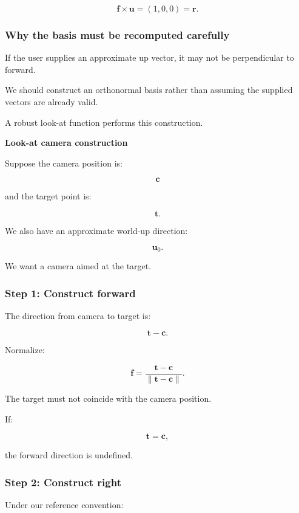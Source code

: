 \[
 \mathbf f\times\mathbf u=(1,0,0)=\mathbf r.
\]

\subsubsection{Why the basis must be recomputed carefully}\label{02-foundations-ii-ch032-why-the-basis-must-be-recomputed-carefully}

If the user supplies an approximate up vector, it may not be perpendicular to forward.

We should construct an orthonormal basis rather than assuming the supplied vectors are already valid.

A robust look-at function performs this construction.

\textbf{Look-at camera construction}

Suppose the camera position is:

\[
 \mathbf c
\]

and the target point is:

\[
 \mathbf t.
\]

We also have an approximate world-up direction:

\[
 \mathbf u_0.
\]

We want a camera aimed at the target.

\subsubsection{Step 1: Construct forward}\label{02-foundations-ii-ch032-step-1-construct-forward}

The direction from camera to target is:

\[
 \mathbf t-\mathbf c.
\]

Normalize:

\[
 \boxed{ \mathbf f= \frac{\mathbf t-\mathbf c} {\|\mathbf t-\mathbf c\|} }.
\]

The target must not coincide with the camera position.

If:

\[
 \mathbf t=\mathbf c,
\]

the forward direction is undefined.

\subsubsection{Step 2: Construct right}\label{02-foundations-ii-ch032-step-2-construct-right}

Under our reference convention:

